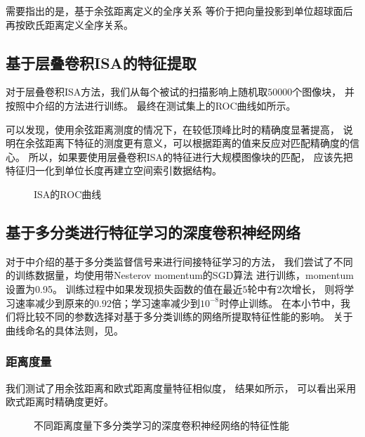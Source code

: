 需要指出的是，基于余弦距离定义的全序关系
等价于把向量投影到单位超球面后再按欧氏距离定义全序关系。

\subsection{基于层叠卷积ISA的特征提取\label{sec:expr:isa}}
对于层叠卷积ISA方法，我们从每个被试的扫描影响上随机取$50000$个图像块，
并按照中介绍的方法进行训练。
最终在测试集上的ROC曲线如所示。

可以发现，使用余弦距离测度的情况下，在较低顶峰比时的精确度显著提高，
说明在余弦距离下特征的测度更有意义，可以根据距离的值来反应对匹配精确度的信心。
所以，如果要使用层叠卷积ISA的特征进行大规模图像块的匹配，
应该先把特征归一化到单位长度再建立空间索引数据结构。

\begin{figure}[H]
    \caption{ISA的ROC曲线}
    \label{fig:expr:curve:ISA}
\end{figure}

\subsection{基于多分类进行特征学习的深度卷积神经网络\label{sec:expr:clsfy}}
对于中介绍的基于多分类监督信号来进行间接特征学习的方法，
我们尝试了不同的训练数据量，均使用带Nesterov momentum的SGD算法
\cite{sutskever2013importance}进行训练，momentum设置为0.95。
训练过程中如果发现损失函数的值在最近$5$轮中有$2$次增长，
则将学习速率减少到原来的$0.92$倍；学习速率减少到$10^{-8}$时停止训练。
在本小节中，我们将比较不同的参数选择对基于多分类训练的网络所提取特征性能的影响。
关于曲线命名的具体法则，见。

\subsubsection{距离度量}
我们测试了用余弦距离和欧式距离度量特征相似度，
结果如所示，
可以看出采用欧式距离时精确度更好。

\begin{figure}[H]
    \caption{不同距离度量下多分类学习的深度卷积神经网络的特征性能}
    \label{fig:expr:curve:clsfy:measure}
\end{figure}

